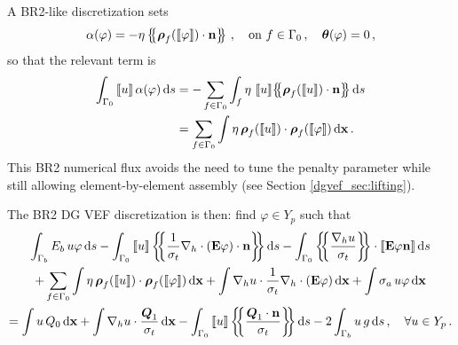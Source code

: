 \documentclass[../doc.tex]{subfiles}
\begin{document}
A BR2-like discretization sets 
	\begin{equation}
		\alpha(\varphi) = -\eta\left\{\!\!\left\{\boldsymbol{\rho}_f(\left\llbracket\varphi \right\rrbracket)\cdot\boldsymbol{\mathrm{n}}\right\}\!\!\right\} \,, \quad \text{on} \ f \in \Gamma_0 \,, \quad \boldsymbol{\theta}(\varphi) = 0 \,,
	\end{equation}
so that the relevant term is 
	\begin{equation}
	\begin{aligned}
		\int_{\Gamma_0} \jump{u} \alpha(\varphi) \ud s &= -\sum_{f\in\Gamma_0}\int_{f} \eta\,\jump{u}\!\avg{\vec{\rho}_f(\jump{u})\cdot\n} \ud s \\
		&= \sum_{f\in\Gamma_0}\int \eta\,\vec{\rho}_f(\jump{u})\cdot\vec{\rho}_f(\jump{\varphi}) \ud \x \,.
	\end{aligned}
	\end{equation}
This BR2 numerical flux avoids the need to tune the penalty parameter while still allowing element-by-element assembly (see Section \ref{dgvef_sec:lifting}). 

The BR2 DG VEF discretization is then: find $\varphi \in Y_p$ such that 
	\begin{multline} \label{dgvef:br2}
		\int_{\Gamma_b} E_b\, u \varphi \ud s - \int_{\Gamma_0} \jump{u} \avg{\frac{1}{\sigma_t}\nablah\cdot\paren{\E\varphi}\cdot\n} \ud s - \int_{\Gamma_0} \avg{\frac{\nablah u}{\sigma_t}} \cdot \jump{\E\varphi\n} \ud s \\
		+ \sum_{f\in\Gamma_0} \int \eta\, \vec{\rho}_f(\jump{u}) \cdot \vec{\rho}_f(\jump{\varphi}) \ud \x + \int \nablah u \cdot \frac{1}{\sigma_t}\nablah\cdot\paren{\E\varphi} \ud \x + \int \sigma_a\, u \varphi \ud \x \\ 
		= \int u\, Q_0 \ud \x + \int \nablah u \cdot \frac{\vec{Q}_1}{\sigma_t} \ud \x - \int_{\Gamma_0} \jump{u} \avg{\frac{\vec{Q}_1\cdot\n}{\sigma_t}} \ud s - 2\int_{\Gamma_b} u\, g \ud s \,, \quad \forall u \in Y_p \,. 
	\end{multline}
\end{document}
